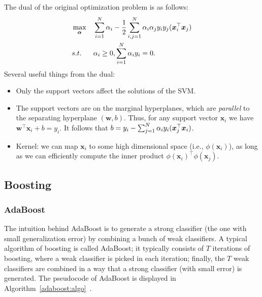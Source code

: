         The dual of the original optimization problem is as follows:
            \begin{equation}
                \begin{aligned}
                    & \max_{\bm{\alpha}} & & \sum_{i=1}^{N}{\alpha_i} - \frac{1}{2}\sum_{i,j=1}^{N}{\alpha_i \alpha_j y_i y_j (\bm{x}_i^\top \bm{x}_j) } \\
                    & s.t. & & \alpha_i \ge 0, \sum_{i=1}^{N}{\alpha_i y_i} = 0.
                \end{aligned}
            \end{equation}
        Several useful things from the dual:
        \begin{itemize}
            \item Only the support vectors affect the solutions of the SVM.
            \item The support vectors are on the marginal hyperplanes, which are \emph{parallel} to the separating hyperplane $(\bm{w}, b)$.
            Thus, for any support vector $\bm{x}_i$ we have $\bm{w}^\top \bm{x}_i + b = y_i$.
            It follows that $b = y_i - \sum_{j=1}^{N}{\alpha_i y_i (\bm{x}_j^\top \bm{x}_i) }$.
            \item Kernel: we can map $\bm{x}_i$ to some high dimensional space (i.e., $\phi(\bm{x}_i)$), as long as we can efficiently compute the inner product $\phi(\bm{x}_i)^\top \phi(\bm{x}_j)$.
        \end{itemize}
    
    
\subsection{Boosting}
\subsubsection{AdaBoost}
The intuition behind AdaBoost is to generate a strong classifier (the one with small generalization error) by combining a bunch of weak classifiers. 
A typical algorithm of boosting is called AdaBoost; it typically consists of $T$ iterations of boosting, where a weak classifier is picked in each iteration; finally, the $T$ weak classifiers are combined in a way that a strong classifier (with small error) is generated. 
The pseudocode of AdaBoost is displayed in Algorithm~\ref{adaboost:algo}~\cite{mohri2018foundations}.

